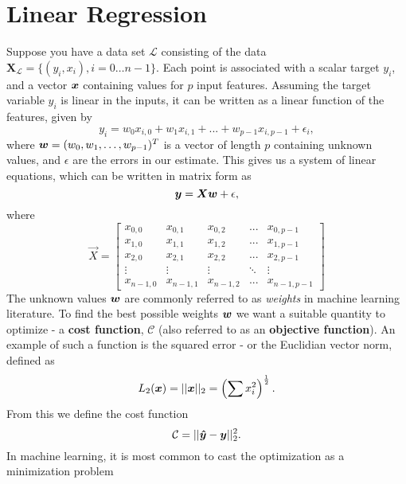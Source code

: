 \section{Linear Regression}\label{sec:linreg}
Suppose you have a data set $\mathcal{L}$ consisting of the data
$\mathbf{X}_\mathcal{L}=\{(y_i, x_i), i=0\ldots n-1\}$. Each point is associated
with a scalar target $y_i$, and a vector ${\boldsymbol{x}}$ containing values for $p$ input
features. Assuming the target variable $y_i$ is linear in the inputs, it can be
written as a linear function of the features, given by
\begin{equation}\label{eq:ols-target}
y_i = w_0 x_{i,0} + w_1 x_{i,1} + ... + w_{p-1} x_{i, p-1} + \epsilon_i,
\end{equation}
where ${\boldsymbol{w}} = (w_0, w_1, \dots, w_{p-1})^T$ is a vector of length
$p$ containing unknown values, and $\epsilon$ are the errors in our estimate.
This gives us a system of linear equations, which can be written in matrix form as
\begin{equation}\label{eq:ols-target-mat}
  {\boldsymbol{y}} = {\boldsymbol{Xw}} + {\boldsymbol{}}{\epsilon},
\end{equation}
where
\begin{equation}
\vec{X} = \left[
\begin{matrix}
x_{0,0} & x_{0,1} & x_{0,2} & ... & x_{0,p-1}\\
x_{1,0} & x_{1,1} & x_{1,2} & ... & x_{1,p-1}\\
x_{2,0} & x_{2,1} & x_{2,2} & ... & x_{2,p-1}\\
\vdots & \vdots & \vdots & \ddots & \vdots\\
x_{n-1,0} & x_{n-1,1} & x_{n-1,2} & ... & x_{n-1,p-1}
\end{matrix}
\right]
\end{equation}
The unknown values ${\boldsymbol{w}}$ are commonly referred to as \textit{weights} in machine 
learning literature. To find the best possible weights ${\boldsymbol{w}}$ we want a suitable
quantity to optimize - a \textbf{cost function}, $\mathcal{C}$ (also referred to as an
\textbf{objective function}). An example of such a function is the squared error - or the Euclidian vector norm, defined as
\begin{equation}
	L_2({\boldsymbol{x}}) =||{\boldsymbol{x}}||_2 = \left(\sum x_i^2\right)^{\frac{1}{2}}.
\end{equation}
From this we define the cost function
\begin{equation}
	\mathcal{C} = || {\boldsymbol{\hat{y}}} - {\boldsymbol{y}} ||_2 ^2.
\end{equation}
In machine learning, it is most common to cast the optimization as a minimization problem
